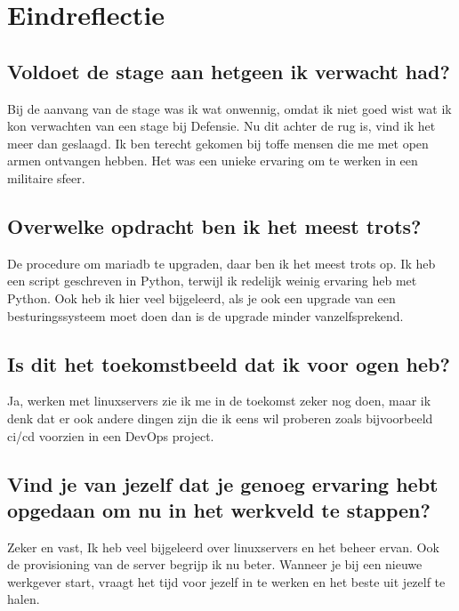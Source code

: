 \section{Eindreflectie}
\label{sec:Eindreflectie}

\subsection{Voldoet de stage aan hetgeen ik verwacht had?}

Bij de aanvang van de stage was ik wat onwennig, omdat ik niet goed wist wat ik kon verwachten van een stage bij Defensie. Nu dit achter de rug is, vind ik het meer dan geslaagd. Ik ben terecht gekomen bij toffe mensen die me met open armen ontvangen hebben. Het was een unieke ervaring om te werken in een militaire sfeer.

\subsection{Overwelke opdracht ben ik het meest trots?}

De procedure om mariadb te upgraden, daar ben ik het meest trots op. Ik heb een script geschreven in Python, terwijl ik redelijk weinig ervaring heb met Python. Ook heb ik hier veel bijgeleerd, als je ook een upgrade van een besturingssysteem moet doen dan is de upgrade minder vanzelfsprekend.

\subsection{Is dit het toekomstbeeld dat ik voor ogen heb?}

Ja, werken met linuxservers zie ik me in de toekomst zeker nog doen, maar ik denk dat er ook andere dingen zijn die ik eens wil proberen zoals bijvoorbeeld \gls{ci}/\gls{cd} voorzien in een DevOps project.

\subsection{Vind je van jezelf dat je genoeg ervaring hebt opgedaan om nu in het werkveld te stappen?}

Zeker en vast, Ik heb veel bijgeleerd over linuxservers en het beheer ervan. Ook de provisioning van de server begrijp ik nu beter. 
Wanneer je bij een nieuwe werkgever start, vraagt het tijd voor jezelf in te werken en het beste uit jezelf te halen.